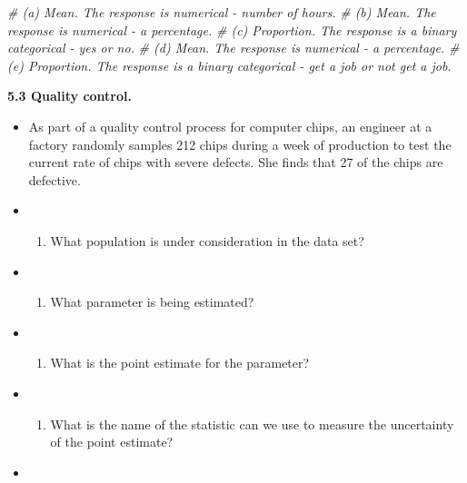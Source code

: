 \documentclass[]{book}
\newenvironment{Shaded}{\begin{snugshade}}{\end{snugshade}}
\newcommand{\CommentTok}[1]{\textcolor[rgb]{0.56,0.35,0.01}{\textit{#1}}}
\providecommand{\tightlist}{%
  \setlength{\itemsep}{0pt}\setlength{\parskip}{0pt}}
\begin{document}
\begin{Shaded}
\begin{Highlighting}[]
\CommentTok{# (a) Mean. The response is numerical - number of hours.}
\CommentTok{# (b) Mean. The response is numerical - a percentage.}
\CommentTok{# (c) Proportion. The response is a binary categorical - yes or no. }
\CommentTok{# (d) Mean. The response is numerical - a percentage.}
\CommentTok{# (e) Proportion. The response is a binary categorical - get a job or not get a job. }
\end{Highlighting}
\end{Shaded}

\textbf{5.3 Quality control.}

\begin{itemize}
\item
  As part of a quality control process for computer chips, an engineer at a factory randomly samples 212 chips during a week of production to test the current rate of chips with severe defects. She finds that 27 of the chips are defective.
\item
  \begin{enumerate}
  \def\labelenumi{(\alph{enumi})}
  \tightlist
  \item
    What population is under consideration in the data set?
  \end{enumerate}
\item
  \begin{enumerate}
  \def\labelenumi{(\alph{enumi})}
  \setcounter{enumi}{1}
  \tightlist
  \item
    What parameter is being estimated?
  \end{enumerate}
\item
  \begin{enumerate}
  \def\labelenumi{(\alph{enumi})}
  \setcounter{enumi}{2}
  \tightlist
  \item
    What is the point estimate for the parameter?
  \end{enumerate}
\item
  \begin{enumerate}
  \def\labelenumi{(\alph{enumi})}
  \setcounter{enumi}{3}
  \tightlist
  \item
    What is the name of the statistic can we use to measure the uncertainty of the point estimate?
  \end{enumerate}
\item
  \begin{enumerate}
  \def\labelenumi{(\alph{enumi})}
  \setcounter{enumi}{4}
  \tightlist

\end{enumerate}
\end{itemize}
\end{document}
